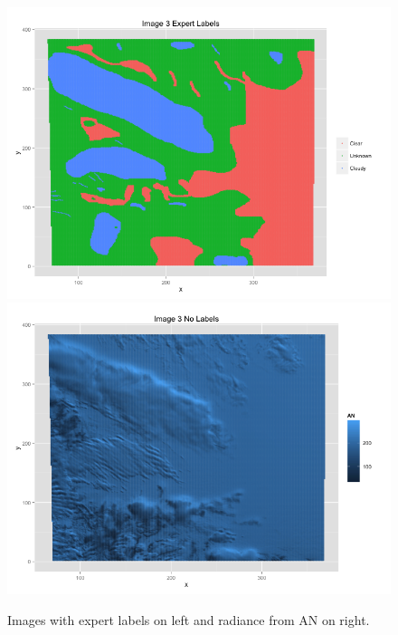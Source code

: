 \documentclass{article}\usepackage[]{graphicx}\usepackage[]{color}
\begin{document}
\begin{figure}
\includegraphics[scale = .35]{Image3Experts.png}
\includegraphics[scale = .35]{Image3Raw.png}

\caption{Images with expert labels on left and radiance from AN on right.}
\end{figure}
\end{document}
